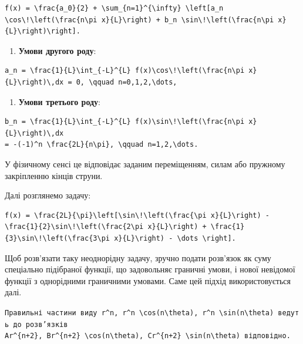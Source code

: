 \documentclass[
  ukrainian,
]{article}
\providecommand{\tightlist}{%
  \setlength{\itemsep}{0pt}\setlength{\parskip}{0pt}}
\begin{document}
\begin{verbatim}
f(x) = \frac{a_0}{2} + \sum_{n=1}^{\infty} \left[a_n \cos\!\left(\frac{n\pi x}{L}\right) + b_n \sin\!\left(\frac{n\pi x}{L}\right)\right].
\end{verbatim}

\begin{enumerate}
\def\labelenumi{\arabic{enumi}.}
\setcounter{enumi}{1}
\tightlist
\item
  \textbf{Умови другого роду}:
\end{enumerate}

\begin{verbatim}
a_n = \frac{1}{L}\int_{-L}^{L} f(x)\cos\!\left(\frac{n\pi x}{L}\right)\,dx = 0, \qquad n=0,1,2,\dots,
\end{verbatim}

\begin{enumerate}
\def\labelenumi{\arabic{enumi}.}
\setcounter{enumi}{2}
\tightlist
\item
  \textbf{Умови третього роду}:
\end{enumerate}

\begin{verbatim}
b_n = \frac{1}{L}\int_{-L}^{L} f(x)\sin\!\left(\frac{n\pi x}{L}\right)\,dx
= -(-1)^n \frac{2L}{n\pi}, \qquad n=1,2,\dots.
\end{verbatim}

У фізичному сенсі це відповідає заданим переміщенням, силам або пружному
закріпленню кінців струни.

Далі розглянемо задачу:

\begin{verbatim}
f(x) = \frac{2L}{\pi}\left[\sin\!\left(\frac{\pi x}{L}\right) - \frac{1}{2}\sin\!\left(\frac{2\pi x}{L}\right) + \frac{1}{3}\sin\!\left(\frac{3\pi x}{L}\right) - \dots \right].
\end{verbatim}

Щоб розв'язати таку неоднорідну задачу, зручно подати розв'язок як суму
спеціально підібраної функції, що задовольняє граничні умови, і нової
невідомої функції з однорідними граничними умовами. Саме цей підхід
використовується далі.

\texttt{Правильні\ частини\ виду\ \textquotesingle{}r\^{}n\textquotesingle{},\ \textquotesingle{}r\^{}n\ \textbackslash{}cos(n\textbackslash{}theta)\textquotesingle{},\ \textquotesingle{}r\^{}n\ \textbackslash{}sin(n\textbackslash{}theta)\textquotesingle{}\ ведуть\ до\ розв’язків}
\texttt{\textquotesingle{}Ar\^{}\{n+2\}\textquotesingle{},\ \textquotesingle{}Br\^{}\{n+2\}\ \textbackslash{}cos(n\textbackslash{}theta)\textquotesingle{},\ \textquotesingle{}Cr\^{}\{n+2\}\ \textbackslash{}sin(n\textbackslash{}theta)\textquotesingle{}\ відповідно.}
\end{document}
